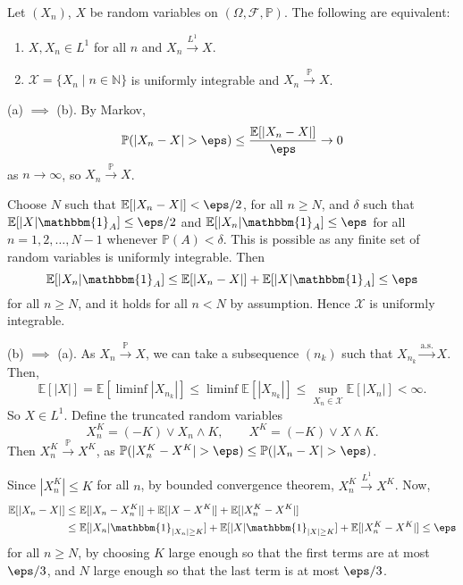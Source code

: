 \documentclass[12pt]{article}
\begin{document}
\begin{theorem}
	Let $(X_n)$, $X$ be random variables on $(\Omega, \mathcal{F}, \mathbb{P})$. The following are equivalent:
	\begin{enumerate}[\normalfont(a)]
		\item $X, X_n \in L^1$ for all $n$ and $X_n \overset{L^1}{\to} X$.
		\item $\mathcal{X} = \{X_n \mid n \in \mathbb{N}\}$ is uniformly integrable and $X_n \overset{\mathbb{P}}{\to} X$.
	\end{enumerate}
\end{theorem}

\begin{proofbox}
	(a) $\implies$ (b). By Markov,
	\[
	\mathbb{P}(|X_n -X| > \eps) \leq \frac{\mathbb{E}[|X_n - X|]}{\eps} \to 0
	\]
	as $n \to \infty$, so $X_n \overset{\mathbb{P}}{\to} X$.

	Choose $N$ such that $\mathbb{E}[|X_n - X|] < \eps/2$, for all $n \geq N$, and $\delta$ such that $\mathbb{E}[|X| \mathbbm{1}_{A}] \leq \eps/2$ and $\mathbb{E}[|X_n| \mathbbm{1}_{A}] \leq \eps$ for all $n = 1, 2, \ldots, N-1$ whenever $\mathbb{P}(A) < \delta$. This is possible as any finite set of random variables is uniformly integrable. Then
	\[
	\mathbb{E}[|X_n|\mathbbm{1}_{A}] \leq \mathbb{E}[|X_n - X|] + \mathbb{E}[|X| \mathbbm{1}_{A}] \leq \eps
	\]
	for all $n \geq N$, and it holds for all $n < N$ by assumption. Hence $\mathcal{X}$ is uniformly integrable.

	(b) $\implies$ (a). As $X_n \overset{\mathbb{P}}{\to} X$, we can take a subsequence $(n_k)$ such that $X_{n_k} \overset{\text{a.s.}}{\to} X$. Then,
	\[
	\mathbb{E}[|X|] = \mathbb{E}[\liminf |X_{n_k}|] \leq \liminf \mathbb{E}[|X_{n_k}|] \leq \sup_{X_n \in \mathcal{X}} \mathbb{E}[|X_n|] < \infty.
	\]
	So $X \in L^1$. Define the truncated random variables
	\[
	X_n^K = (-K) \vee X_n \wedge K, \qquad X^K = (-K) \vee X \wedge K.
	\]
	Then $X_n^K \overset{\mathbb{P}}{\to} X^K$, as $\mathbb{P}(|X_n^K - X^K| > \eps) \leq \mathbb{P}(|X_n - X| > \eps)$.

	Since $|X_n^K| \leq K$ for all $n$, by bounded convergence theorem, $X_n^K \overset{L^1}{\to} X^K$. Now,
	\begin{align*}
		\mathbb{E}[|X_n-X|] & \leq \mathbb{E}[|X_n - X_n^K|] + \mathbb{E}[|X - X^K|] + \mathbb{E}[|X_n^K - X^K|] \\
				    &\leq \mathbb{E}[|X_n|\mathbbm{1}_{|X_n| \geq K}] + \mathbb{E}[|X| \mathbbm{1}_{|X| \geq K}] + \mathbb{E}[|X_n^K - X^K|] \leq \eps
	\end{align*}
	for all $n \geq N$, by choosing $K$ large enough so that the first terms are at most $\eps/3$, and $N$ large enough so that the last term is at most $\eps/3$.
\end{proofbox}
\end{document}
